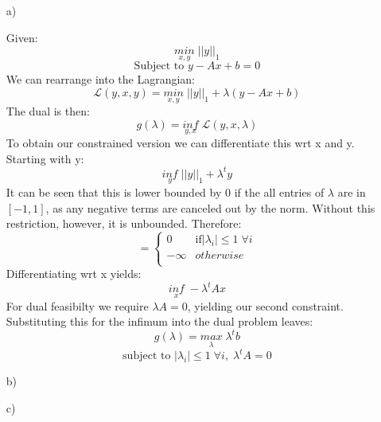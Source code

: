 \documentclass[10pt]{article}
\numberwithin{equation}{section}
\begin{document}
\begin{enumerate}
\item[a)]{
    Given:
    $$\underset{x,y}{min}\; ||y||_1$$
    $$\text{Subject to } y-Ax + b = 0$$
    We can rearrange into the Lagrangian:
    $$\mathcal{L}(y,x,y) = \underset{x,y}{min}\; ||y||_1 + \lambda (y-Ax+b)$$
    The dual is then:
    $$g(\lambda) = \underset{y,x}{inf}\; \mathcal{L}(y,x,\lambda)$$
    To obtain our constrained version we can differentiate this wrt x and y.
    Starting with y:
    $$\underset{y}{inf}\; ||y||_1 + \lambda^t y$$
    It can be seen that this is lower bounded by 0 if the all entries of $\lambda$ are in $[-1,1]$, as any negative terms are canceled out by the norm. Without this restriction, however, it is unbounded. Therefore:
    $$ = \begin{cases}
      0 & \text{if} |\lambda_i| \leq 1\; \forall i\\
      -\infty & otherwise\\
    \end{cases}$$
    Differentiating wrt x yields:
    $$\underset{x}{inf}\; -\lambda^t Ax$$
    For dual feasibilty we require $\lambda A = 0$, yielding our second constraint.
    Substituting this for the infimum into the dual problem leaves:
    $$g(\lambda) = \underset{\lambda}{max}\; \lambda^t b$$
    $$\text{subject to } |\lambda_i| \leq 1\; \forall i,\; \lambda^t A =0$$

}
\item[b)]{

}
\item[c)]{

}
\end{enumerate}
\end{document}
